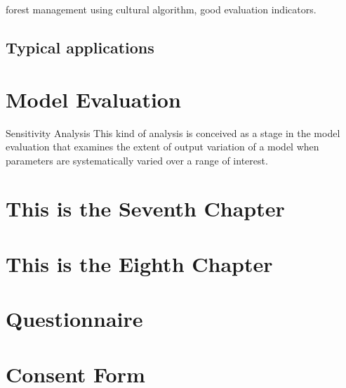 \documentclass[12pt]{caltech_thesis}
\begin{document}
\begin{bibunit}
\citep{liu2015land} forest management using cultural algorithm, good evaluation indicators. 


\renewcommand{\bibsection}{\section*{\refname}}
\putbib[ownpubs]  %
\end{bibunit}

\section{Typical applications}
\begin{bibunit}





\renewcommand{\bibsection}{\section*{\refname}}
\putbib[ownpubs]  %
\end{bibunit}






\chapter{Model Evaluation}
Sensitivity Analysis
This kind of analysis is conceived as a stage in the model evaluation that examines the extent of output variation of a model when parameters are systematically varied over a range of interest.



\chapter{This is the Seventh Chapter}
\chapter{This is the Eighth Chapter}




\appendix

\chapter{Questionnaire}
\chapter{Consent Form}

\printindex

\theendnotes

\pocketmaterial
{}
\end{document}
